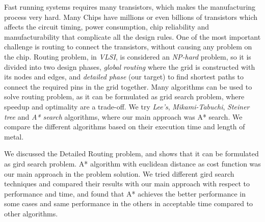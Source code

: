 Fast running systems requires many transistors, which makes the manufacturing process very hard.
Many Chips have millions or even billions of transistors which affects the circuit timing, power consumption, chip reliability and manufacturability that complicate all the design rules.
One of the most important challenge is routing to connect the transistors, without causing any problem on the chip.
Routing problem, in \emph{VLSI}, is considered an \emph{NP-hard} problem, so it is divided into two design phases, \emph{global routing} where the grid is constructed with its nodes and edges,
and \emph{detailed phase} (our target) to find shortest paths to connect the required pins in the grid together.
Many algorithms can be used to solve routing problem, as it can be formulated as grid search problem, where speedup and optimality are a trade-off.
We try \emph{Lee's}, \emph{Mikami-Tabuchi}, \emph{Steiner tree} and \emph{A* search} algorithms, where our main approach was A* search.
We compare the different algorithms based on their execution time and length of metal.



We discussed the Detailed Routing problem, and shows that it can be formulated as gird search problem.
A* algorithm with euclidean distance as cost function was our main approach in the problem solution.
We tried different gird search techniques and compared their results with our main approach with respect to performance and time, and found that
A* achieves the better performance in some cases and same performance in the others in acceptable time compared to other algorithms.